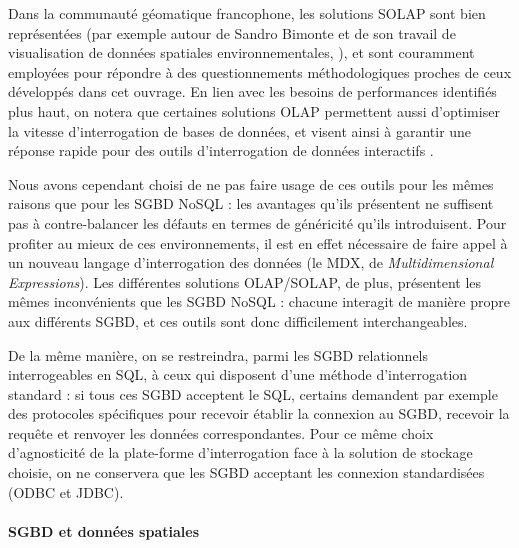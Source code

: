 			Dans la communauté géomatique francophone, les solutions SOLAP sont bien représentées (par exemple autour de Sandro Bimonte et de son travail de visualisation de données spatiales environnementales,  \autocite{bimonte_integration_2007, bimonte_towards_2005, zaamoune_new_2013}), et sont couramment employées pour répondre à des questionnements méthodologiques proches de ceux développés dans cet ouvrage.
			En lien avec les besoins de performances identifiés plus haut, on notera que certaines solutions OLAP permettent aussi d'optimiser la vitesse d'interrogation de bases de données, et visent ainsi à garantir une réponse rapide pour des outils d'interrogation de données interactifs \autocite{zeng_iolap_2016}.
			
			Nous avons cependant choisi de ne pas faire usage de ces outils pour les mêmes raisons que pour les SGBD NoSQL : les avantages qu'ils présentent ne suffisent pas à contre-balancer les défauts en termes de généricité qu'ils introduisent. Pour profiter au mieux de ces environnements, il est en effet nécessaire de faire appel à un nouveau langage d'interrogation des données (le \og MDX\fg{}, de \og \textit{Multidimensional Expressions}\fg{}).
			Les différentes solutions OLAP/SOLAP, de plus, présentent les mêmes inconvénients que les SGBD NoSQL : chacune interagit de manière propre aux différents SGBD, et ces outils sont donc difficilement interchangeables.
			
			De la même manière, on se restreindra, parmi les SGBD relationnels interrogeables en SQL, à ceux qui disposent d'une méthode d'interrogation standard : si tous ces SGBD acceptent le SQL, certains demandent par exemple des protocoles spécifiques pour recevoir établir la connexion au SGBD, recevoir la requête et renvoyer les données correspondantes.
			Pour ce même choix \og d'agnosticité \fg{} de la plate-forme d'interrogation face à la solution de stockage choisie, on ne conservera que les SGBD acceptant les connexion standardisées (ODBC et JDBC).
			
			\paragraph*{SGBD et données spatiales}\label{par:sgbd-spatial}
			
